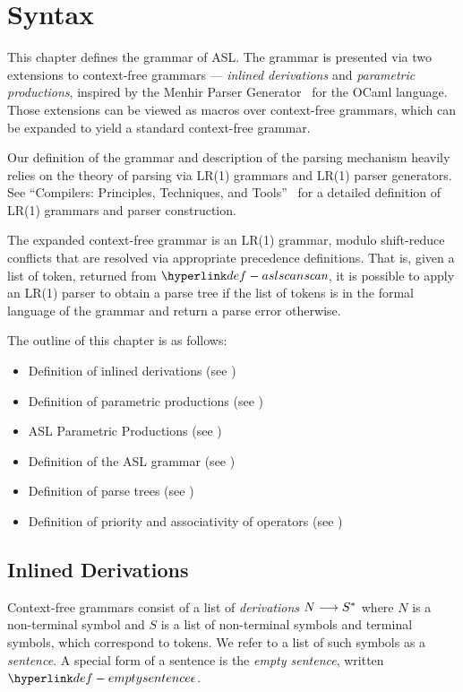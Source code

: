 \chapter{Syntax\label{chap:Syntax}}

This chapter defines the grammar of ASL. The grammar is presented via two extensions
to context-free grammars --- \emph{inlined derivations} and \emph{parametric productions},
inspired by the Menhir Parser Generator~\cite{MenhirManual} for the OCaml language.
Those extensions can be viewed as macros over context-free grammars, which can be
expanded to yield a standard context-free grammar.

Our definition of the grammar and description of the parsing mechanism heavily relies
on the theory of parsing via LR(1) grammars and LR(1) parser generators.
%
See ``Compilers: Principles, Techniques, and Tools''~\cite{ASU86} for a detailed
definition of LR(1) grammars and parser construction.

The expanded context-free grammar is an LR(1) grammar, modulo shift-reduce
conflicts that are resolved via appropriate precedence definitions.
That is, given a list of token, returned from $\aslscan$, it is possible to apply
an LR(1) parser to obtain a parse tree if the list of tokens is in the formal language
of the grammar and return a parse error otherwise.

The outline of this chapter is as follows:
\begin{itemize}
  \item Definition of inlined derivations (see )
  \item Definition of parametric productions (see )
  \item ASL Parametric Productions (see )
  \item Definition of the ASL grammar (see )
  \item Definition of parse trees (see )
  \item Definition of priority and associativity of operators (see )
\end{itemize}

\section{Inlined Derivations \label{sec:InlinedDerivations}}
Context-free grammars consist of a list of \emph{derivations} $N \longrightarrow S^*$
where $N$ is a non-terminal symbol and $S$ is a list of non-terminal symbols and terminal symbols,
which correspond to tokens.
We refer to a list of such symbols as a \emph{sentence}.
\hypertarget{def-emptysentence}{}
A special form of a sentence is the \emph{empty sentence}, written $\emptysentence$.

